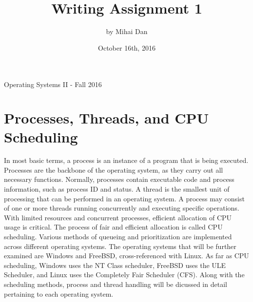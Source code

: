 \documentclass[10pt, onecolumn]{IEEEtran}
\title{Writing Assignment 1}
\author{by Mihai Dan}
\date{October 16th, 2016}
\begin{document}
    \begin{center}
        \begin{minipage}[h]{\textwidth}
            \maketitle
        \end{minipage}
    \end{center}
    
    \begin{center}
        Operating Systems II - Fall 2016
    \end{center}
    
    \newpage

    \section*{Processes, Threads, and CPU Scheduling}
        In most basic terms, a process is an instance of a program that is being executed. Processes are the backbone of the operating system, as they carry out all necessary functions. Normally, processes contain executable code and process information, such as process ID and status. A thread is the smallest unit of processing that can be performed in an operating system. A process may consist of one or more threads running concurrently and executing specific operations. With limited resources and concurrent processes, efficient allocation of CPU usage is critical. The process of fair and efficient allocation is called CPU scheduling. Various methods of queueing and prioritization are implemented across different operating systems. The operating systems that will be further examined are Windows and FreeBSD, cross-referenced with Linux. As far as CPU scheduling, Windows uses the NT Class scheduler, FreeBSD uses the ULE Scheduler, and Linux uses the Completely Fair Scheduler (CFS). Along with the scheduling methods, process and thread handling will be dicussed in detail pertaining to each operating system.
        
\end{document}
